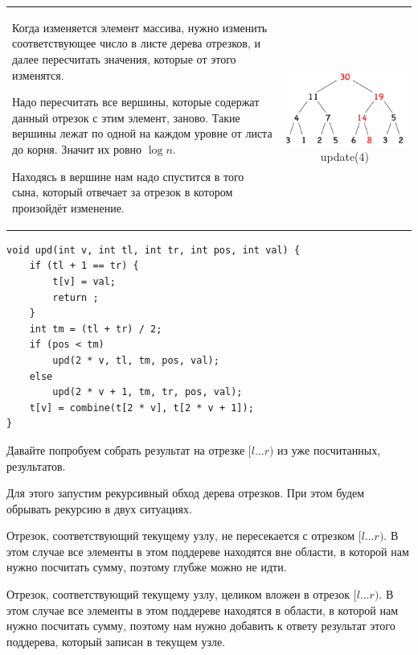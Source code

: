 
\down
\begin{tabular}{m{15cm}c}
	Когда изменяется элемент массива, нужно изменить соответствующее число в листе дерева отрезков, и далее пересчитать значения, которые от этого изменятся.
	
	Надо пересчитать все вершины, которые содержат данный отрезок с этим элемент, заново. Такие вершины лежат по одной на каждом уровне от листа до корня. Значит их ровно $\log n$.
	
	Находясь в вершине нам надо спустится в того сына, который отвечает за отрезок в котором произойдёт изменение.
	
	&
	
	\begin{minipage}{2.5cm}	
		\includegraphics[scale=0.5]{set_edu.png} update(4)
	\end{minipage}
\end{tabular}
\down
\up \up
\begin{verbatim}
void upd(int v, int tl, int tr, int pos, int val) {
	if (tl + 1 == tr) {
		t[v] = val;
		return ;
	}
	int tm = (tl + tr) / 2;
	if (pos < tm)
	    upd(2 * v, tl, tm, pos, val);
	else
	    upd(2 * v + 1, tm, tr, pos, val);
	t[v] = combine(t[2 * v], t[2 * v + 1]);
}
\end{verbatim}

\pagebreak


Давайте попробуем собрать результат на отрезке $[l \ldots r)$ из уже посчитанных, результатов.

Для этого запустим рекурсивный обход дерева отрезков. При этом будем обрывать рекурсию в двух ситуациях.


\begin{MyList}[0pt]
	\item Отрезок, соответствующий текущему узлу, не пересекается с отрезком $[l \ldots r)$. В этом случае все элементы в этом поддереве находятся вне области, в которой нам нужно посчитать сумму, поэтому глубже можно не идти.
	\item Отрезок, соответствующий текущему узлу, целиком вложен в отрезок $[l \ldots r)$. В этом случае все элементы в этом поддереве находятся в области, в которой нам нужно посчитать сумму, поэтому нам нужно добавить к ответу результат этого поддерева, который записан в текущем узле.
\end{MyList}

